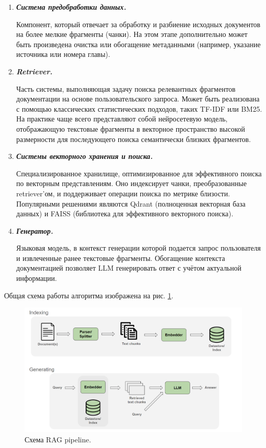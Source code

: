 \begin{enumerate}

  \item \textbf{\textit{Система предобработки данных.}}
  
    Компонент, который отвечает за обработку и разбиение исходных документов на более мелкие фрагменты (чанки). На этом этапе дополнительно может быть произведена очистка или обогащение метаданными (например, указание источника или номера главы).
    
  \item \textbf{\textit{Retriever.}}
  
    Часть системы, выполняющая задачу поиска релевантных фрагментов документации на основе пользовательского запроса. Может быть реализована с помощью классических статистических подходов, таких TF-IDF или BM25. На практике чаще всего представляют собой нейросетевую модель, отображающую текстовые фрагменты в векторное пространство высокой размерности для последующего поиска семантически близких фрагментов. 
    
  \item \textit{\textbf{Системы векторного хранения и поиска.}}
  
    Специализированное хранилище, оптимизированное для эффективного поиска по векторным представлениям. Оно индексирует чанки, преобразованные retriever’ом, и поддерживает операции поиска по метрике близости. Популярными решениями являются Qdrant (полноценная векторная база данных) и FAISS (библиотека для эффективного векторного поиска).

  \item \textit{\textbf{Генератор.}}
  
    Языковая модель, в контекст генерации которой подается запрос пользователя и извлеченные ранее текстовые фрагменты. Обогащение контекста документацией позволяет LLM генерировать ответ с учётом актуальной информации.
  
\end{enumerate}

Общая схема работы алгоритма изображена на рис. \ref{RAG pipeline intro}.

\begin{figure}[ht!]
    \centering
    \includegraphics[scale=0.4]{images/rag_intro.png}
    \caption{Схема RAG pipeline.}
    \label{RAG pipeline intro}
\end{figure}

